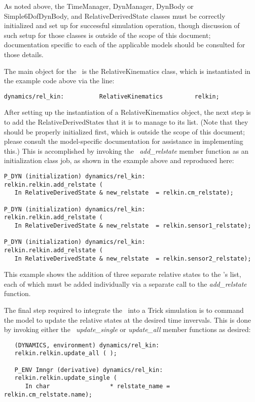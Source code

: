 As noted above, the TimeManager, DynManager, DynBody or Simple6DofDynBody,
and RelativeDerivedState classes must be correctly initialized and set up for
successful simulation operation, though discussion of such setup for those
classes is outside of the scope of this document; documentation specific to each
of the applicable models should be consulted for those details.

The main object for the \relkinDesc\ is the RelativeKinematics class, which is
instantiated in the example code above via the line:

\begin{verbatim}
dynamics/rel_kin:          RelativeKinematics         relkin;
\end{verbatim}

After setting up the instantiation of a RelativeKinematics object, the next
step is to add the RelativeDerivedStates that it is to manage to its list.
(Note that they should be properly initialized first, which is outside the
scope of this document; please consult the model-specific documentation for
assistance in implementing this.)  This is accomplished by invoking the
\relkinDesc\ {\em add\_relstate} member function as an initialization class job,
as shown in the example above and reproduced here:

\begin{verbatim}
P_DYN (initialization) dynamics/rel_kin:
relkin.relkin.add_relstate (
   In RelativeDerivedState & new_relstate  = relkin.cm_relstate);

P_DYN (initialization) dynamics/rel_kin:
relkin.relkin.add_relstate (
   In RelativeDerivedState & new_relstate  = relkin.sensor1_relstate);

P_DYN (initialization) dynamics/rel_kin:
relkin.relkin.add_relstate (
   In RelativeDerivedState & new_relstate  = relkin.sensor2_relstate);
\end{verbatim}

This example shows the addition of three separate relative states to the
\relkinDesc's list, each of which must be added individually via a separate
call to the {\em add\_relstate} function.

The final step required to integrate the \relkinDesc\ into a Trick simulation
is to command the model to update the relative states at the desired time
invervals. This is done by invoking either the \relkinDesc\ {\em update\_single}
or {\em update\_all} member functions as desired:

\begin{verbatim}
   (DYNAMICS, environment) dynamics/rel_kin:
   relkin.relkin.update_all ( );

   P_ENV Imngr (derivative) dynamics/rel_kin:
   relkin.relkin.update_single (
      In char                 * relstate_name = relkin.cm_relstate.name);
\end{verbatim}

